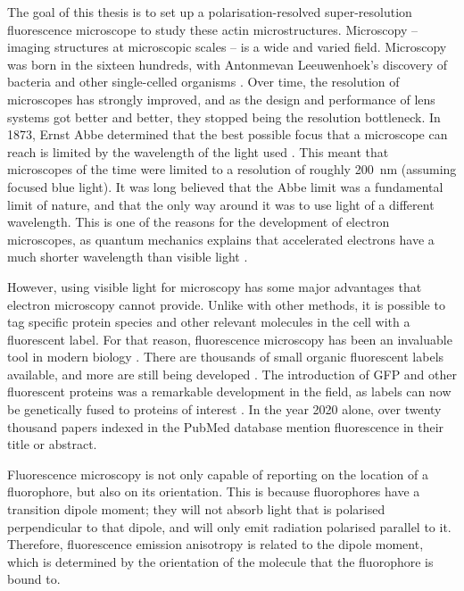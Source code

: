 The goal of this thesis is to set up a polarisation-resolved super-resolution fluorescence microscope to study these actin microstructures.	Microscopy -- imaging structures at microscopic scales -- is a wide and varied field. Microscopy was born in the sixteen hundreds, with Antonmevan Leeuwenhoek's discovery of bacteria and other single-celled organisms \cite{VanZuylen1981}. Over time, the resolution of microscopes has strongly improved, and as the design and performance of lens systems got better and better, they stopped being the resolution bottleneck. In 1873, Ernst Abbe determined that the best possible focus that a microscope can reach is limited by the wavelength of the light used \cite{Abbe1873}. This meant that microscopes of the time were limited to a resolution of roughly 200~nm (assuming focused blue light). It was long believed that the Abbe limit was a fundamental limit of nature, and that the only way around it was to use light of a different wavelength. This is one of the reasons for the development of electron microscopes, as quantum mechanics explains that accelerated electrons have a much shorter wavelength than visible light \cite{Smith2008}. 

However, using visible light for microscopy has some major advantages that electron microscopy cannot provide. Unlike with other methods, it is possible to tag specific protein species and other relevant molecules in the cell with a fluorescent label. For that reason, fluorescence microscopy has been an invaluable tool in modern biology \cite{Danial2016}.  There are thousands of small organic fluorescent labels available, and more are still being developed \cite{Zhang2002, Resch-Genger2008}. The introduction of GFP and other fluorescent proteins was a remarkable development in the field, as labels can now be genetically fused to proteins of interest \cite{Shaner2005, Matlashov2020}. In the year 2020 alone, over twenty thousand papers indexed in the PubMed database mention fluorescence in their title or abstract.

Fluorescence microscopy is not only capable of reporting on the location of a fluorophore, but also on its orientation. This is because fluorophores have a transition dipole moment; they will not absorb light that is polarised perpendicular to that dipole, and will only emit radiation polarised parallel to it. Therefore, fluorescence emission anisotropy is related to the dipole moment, which is determined by the orientation of the molecule that the fluorophore is bound to.

